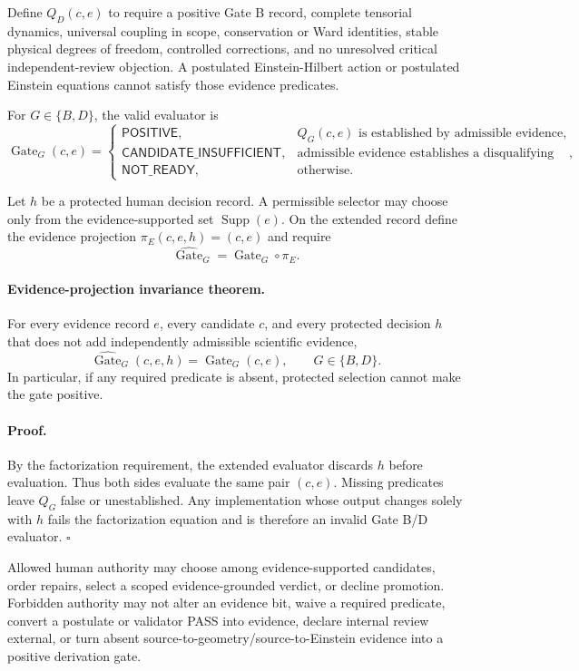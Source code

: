 \documentclass[11pt]{article}
\newcommand{\Gate}{\operatorname{Gate}}
\newcommand{\Supp}{\operatorname{Supp}}
\newcommand{\Positive}{\mathsf{POSITIVE}}
\newcommand{\NotReady}{\mathsf{NOT\_READY}}
\newcommand{\Insufficient}{\mathsf{CANDIDATE\_INSUFFICIENT}}
\begin{document}
Define $Q_D(c,e)$ to require a positive Gate B record, complete tensorial
dynamics, universal coupling in scope, conservation or Ward identities,
stable physical degrees of freedom, controlled corrections, and no unresolved
critical independent-review objection. A postulated Einstein-Hilbert action
or postulated Einstein equations cannot satisfy those evidence predicates.

For $G\in\{B,D\}$, the valid evaluator is
\[
\Gate_G(c,e)=
\begin{cases}
\Positive, & Q_G(c,e)\text{ is established by admissible evidence},\\
\Insufficient, & \text{admissible evidence establishes a disqualifying failure},\\
\NotReady, & \text{otherwise}.
\end{cases}
\]

Let $h$ be a protected human decision record. A permissible selector may choose
only from the evidence-supported set $\Supp(e)$. On the extended record define
the evidence projection $\pi_E(c,e,h)=(c,e)$ and require
\[
  \widehat{\Gate}_G=\Gate_G\circ\pi_E.
\]

\paragraph{Evidence-projection invariance theorem.}
For every evidence record $e$, every candidate $c$, and every protected
decision $h$ that does not add independently admissible scientific evidence,
\[
  \widehat{\Gate}_G(c,e,h)=\Gate_G(c,e),\qquad G\in\{B,D\}.
\]
In particular, if any required predicate is absent, protected selection cannot
make the gate positive.

\paragraph{Proof.}
By the factorization requirement, the extended evaluator discards $h$ before
evaluation. Thus both sides evaluate the same pair $(c,e)$. Missing predicates
leave $Q_G$ false or unestablished. Any implementation whose output changes
solely with $h$ fails the factorization equation and is therefore an invalid
Gate B/D evaluator. $\square$

Allowed human authority may choose among evidence-supported candidates, order
repairs, select a scoped evidence-grounded verdict, or decline promotion.
Forbidden authority may not alter an evidence bit, waive a required predicate,
convert a postulate or validator PASS into evidence, declare internal review
external, or turn absent source-to-geometry/source-to-Einstein evidence into a
positive derivation gate.
\end{document}
